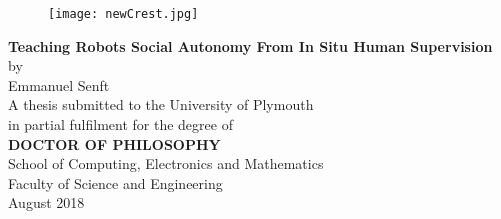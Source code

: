 \begin{center}
\begin{figure}[h]
\centering
\texttt{[image: newCrest.jpg]}
\end{figure}
\vspace{36pt}
\LARGE 
\textbf{Teaching Robots Social Autonomy From In Situ Human Supervision}
\\
\vspace{12pt}
\Large by
\\
\vspace{12pt}
\LARGE 
Emmanuel Senft
\\
\vspace{48pt}
\Large 
A thesis submitted to the University of Plymouth
\\
in partial fulfilment for the degree of
\vspace{36pt}
\\
\textbf{DOCTOR OF PHILOSOPHY}
\vspace{36pt}
\\
School of Computing, Electronics and Mathematics\\
Faculty of Science and Engineering
\vspace{36pt}
\\
\vspace{36pt}
August 2018
\end{center}

\normalsize
